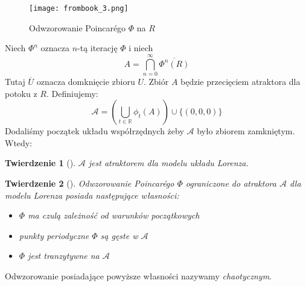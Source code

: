 \documentclass[12pt]{report}
\newtheorem{theorem}{Twierdzenie}
\newcommand{\R}{\mathbb{R}}
\begin{document}
	\begin{figure}[H]
		\centering
		\texttt{[image: frombook\_3.png]}
		\caption{Odwzorowanie Poincarégo $\Phi$ na $R$ \cite{HSD}}
		\label{fig:frombook_3}
	\end{figure}
	\par Niech $\Phi^n$ oznacza $n$-tą iterację $\Phi$ i niech
		\[ A = \bigcap\limits^{\infty}_{n=0} \overline{\Phi^n(R)} \]
	Tutaj $\overline{U}$ oznacza domknięcie zbioru $U$. Zbiór $A$ będzie przecięciem atraktora dla potoku z $R$. Definiujemy:
		\[ \mathcal{A} = (\bigcup\limits_{t \in \R} \phi_t(A)) \cup \{(0, 0, 0)\} \]
	Dodaliśmy początek układu współrzędnych żeby $\mathcal{A}$ było zbiorem zamkniętym. Wtedy:
	\begin{theorem}[\hspace{1sp}\cite{HSD}]
		$\mathcal{A}$ jest atraktorem dla modelu układu Lorenza.
	\end{theorem}
	\begin{theorem}[\hspace{1sp}\cite{HSD}]
		Odwzorowanie Poincarégo $\Phi$ ograniczone do atraktora $\mathcal{A}$ dla modelu Lorenza posiada następujące własności:
		\begin{itemize}
			\item $\Phi$ ma czulą zależność od warunków początkowych
			\item punkty periodyczne $\Phi$ są gęste w $\mathcal{A}$
			\item $\Phi$ jest tranzytywne na $\mathcal{A}$
		\end{itemize}
	\end{theorem}
	Odwzorowanie posiadające powyższe własności nazywamy \textit{chaotycznym}.
\end{document}
